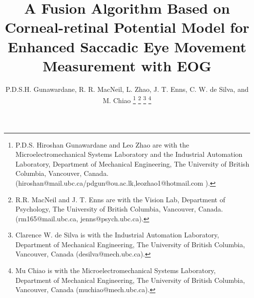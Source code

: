 \documentclass[transmag]{IEEEtran}
\begin{document}
\title{ A Fusion Algorithm Based on Corneal-retinal Potential Model for Enhanced Saccadic Eye Movement Measurement with EOG }

\author{P.D.S.H. Gunawardane, R. R. MacNeil, L. Zhao, J. T. Enns, C. W. de Silva, and M. Chiao
	\thanks{P.D.S. Hiroshan Gunawardane and Leo Zhao are with the Microelectromechanical Systems Laboratory and the Industrial Automation Laboratory, Department of Mechanical Engineering, The University of British Columbia, Vancouver, Canada. (hiroshan@mail.ubc.ca/pdgun@ou.ac.lk,leozhao1@hotmail.com ).}
	\thanks{ R.R. MacNeil and J. T. Enns are with the Vision Lab, Department of Psychology, The University of British Columbia, Vancouver, Canada.(rm165@mail.ubc.ca, jenns@psych.ubc.ca).   }
	\thanks{ Clarence W. de Silva is with the Industrial Automation Laboratory, Department of Mechanical Engineering, The University of British Columbia, Vancouver, Canada (desilva@mech.ubc.ca). }
	\thanks{Mu Chiao is with the Microelectromechanical Systems Laboratory, Department of Mechanical Engineering, The University of British Columbia, Vancouver, Canada (muchiao@mech.ubc.ca).}}

\end{document}

